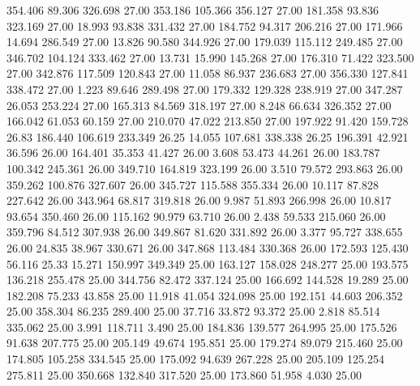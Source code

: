  354.406   89.306  326.698        27.00
 353.186  105.366  356.127        27.00
 181.358   93.836  323.169        27.00
  18.993   93.838  331.432        27.00
 184.752   94.317  206.216        27.00
 171.966   14.694  286.549        27.00
  13.826   90.580  344.926        27.00
 179.039  115.112  249.485        27.00
 346.702  104.124  333.462        27.00
  13.731   15.990  145.268        27.00
 176.310   71.422  323.500        27.00
 342.876  117.509  120.843        27.00
  11.058   86.937  236.683        27.00
 356.330  127.841  338.472        27.00
   1.223   89.646  289.498        27.00
 179.332  129.328  238.919        27.00
 347.287   26.053  253.224        27.00
 165.313   84.569  318.197        27.00
   8.248   66.634  326.352        27.00
 166.042   61.053   60.159        27.00
 210.070   47.022  213.850        27.00
 197.922   91.420  159.728        26.83
 186.440  106.619  233.349        26.25
  14.055  107.681  338.338        26.25
 196.391   42.921   36.596        26.00
 164.401   35.353   41.427        26.00
   3.608   53.473   44.261        26.00
 183.787  100.342  245.361        26.00
 349.710  164.819  323.199        26.00
   3.510   79.572  293.863        26.00
 359.262  100.876  327.607        26.00
 345.727  115.588  355.334        26.00
  10.117   87.828  227.642        26.00
 343.964   68.817  319.818        26.00
   9.987   51.893  266.998        26.00
  10.817   93.654  350.460        26.00
 115.162   90.979   63.710        26.00
   2.438   59.533  215.060        26.00
 359.796   84.512  307.938        26.00
 349.867   81.620  331.892        26.00
   3.377   95.727  338.655        26.00
  24.835   38.967  330.671        26.00
 347.868  113.484  330.368        26.00
 172.593  125.430   56.116        25.33
  15.271  150.997  349.349        25.00
 163.127  158.028  248.277        25.00
 193.575  136.218  255.478        25.00
 344.756   82.472  337.124        25.00
 166.692  144.528   19.289        25.00
 182.208   75.233   43.858        25.00
  11.918   41.054  324.098        25.00
 192.151   44.603  206.352        25.00
 358.304   86.235  289.400        25.00
  37.716   33.872   93.372        25.00
   2.818   85.514  335.062        25.00
   3.991  118.711    3.490        25.00
 184.836  139.577  264.995        25.00
 175.526   91.638  207.775        25.00
 205.149   49.674  195.851        25.00
 179.274   89.079  215.460        25.00
 174.805  105.258  334.545        25.00
 175.092   94.639  267.228        25.00
 205.109  125.254  275.811        25.00
 350.668  132.840  317.520        25.00
 173.860   51.958    4.030        25.00
